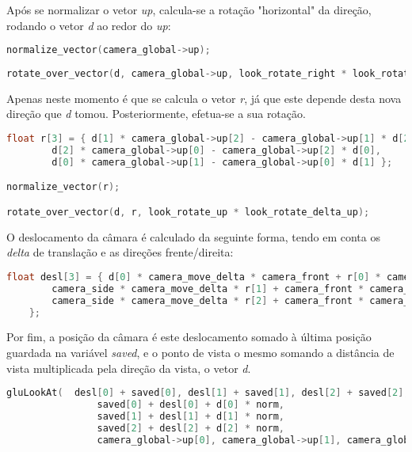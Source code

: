 \documentclass[14pt, a4 paper]{report}
\begin{document}
 Após se normalizar o vetor \textit{up}, calcula-se a rotação "horizontal" da direção, rodando o vetor \textit{d} ao redor do \textit{up}:

 \begin{lstlisting}[language = c++]
normalize_vector(camera_global->up);
	
rotate_over_vector(d, camera_global->up, look_rotate_right * look_rotate_delta_right);
 \end{lstlisting}

Apenas neste momento é que se calcula o vetor \textit{r}, já que este depende desta nova direção que \textit{d} tomou. Posteriormente, efetua-se a sua rotação.

\begin{lstlisting}[language = c++]
float r[3] = { d[1] * camera_global->up[2] - camera_global->up[1] * d[2],
		d[2] * camera_global->up[0] - camera_global->up[2] * d[0],
		d[0] * camera_global->up[1] - camera_global->up[0] * d[1] };

normalize_vector(r);

rotate_over_vector(d, r, look_rotate_up * look_rotate_delta_up);
\end{lstlisting}

O deslocamento da câmara é calculado da seguinte forma, tendo em conta os \textit{delta} de translação e as direções frente/direita:

\begin{lstlisting}[language = c++]
float desl[3] = { d[0] * camera_move_delta * camera_front + r[0] * camera_move_delta * camera_side ,
		camera_side * camera_move_delta * r[1] + camera_front * camera_move_delta * d[1] + camera_up * camera_move_delta,
		camera_side * camera_move_delta * r[2] + camera_front * camera_move_delta * d[2]
	};
\end{lstlisting}

Por fim, a posição da câmara é este deslocamento somado à última posição guardada na variável \textit{saved}, e o ponto de vista o mesmo somando a distância de vista multiplicada pela direção da vista, o vetor \textit{d}.

\begin{lstlisting}[language = c++]
gluLookAt(	desl[0] + saved[0], desl[1] + saved[1], desl[2] + saved[2],
				saved[0] + desl[0] + d[0] * norm, 
				saved[1] + desl[1] + d[1] * norm, 
				saved[2] + desl[2] + d[2] * norm,
				camera_global->up[0], camera_global->up[1], camera_global->up[2]);
\end{lstlisting}
\end{document}
